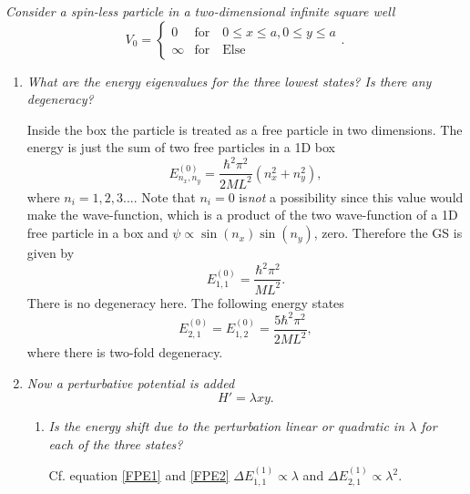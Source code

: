 \begin{example}
	\emph{Consider a spin-less particle in a two-dimensional infinite square well}
	\begin{equation}
		V_0=\begin{cases} 0 &\mbox{for} \quad 0\leq x\leq a, 0\leq y \leq a \\ 
			\infty & \mbox{for} \quad \mbox{Else}  \end{cases}. 
	\end{equation} 
	
	\begin{enumerate}
		\item \emph{What are the energy eigenvalues for the three lowest states? Is there any degeneracy?}\newline
		
		Inside the box the particle is treated as a free particle in two dimensions. The energy is just the sum of two free particles in a 1D box
		\begin{equation}
			E_{n_x,n_y}^{(0)}=\frac{\hbar^2\pi^2}{2ML^2}(n_x^2+n_y^2),
		\end{equation} 
		where $n_i=1,2,3...$. Note that $n_i=0$ is\emph{not} a possibility since this value would make the wave-function, which is a product of the two wave-function of a 1D free particle in a box and $\psi\propto \sin(n_x)\sin(n_y)$, zero. Therefore the GS is given by
		\begin{equation}
			E_{1,1}^{(0)}=\frac{\hbar^2\pi^2}{ML^2}.
		\end{equation} 
		There is no degeneracy here. The following energy states
		\begin{equation}
			E_{2,1}^{(0)}=E_{1,2}^{(0)}=\frac{5\hbar^2\pi^2}{2ML^2},
		\end{equation} 
		where there is two-fold degeneracy. \newline
		
		\item \emph{Now a perturbative potential is added}
		\begin{equation}
			H'=\lambda xy.
		\end{equation} 
		\begin{enumerate}
			\item \emph{Is the energy shift due to the perturbation linear or quadratic in $\lambda$ for each of the three states?}\newline
			
			Cf. equation \eqref{FPE1} and \eqref{FPE2} $\Delta E_{1,1}^{(1)}\propto\lambda$ and $\Delta E_{2,1}^{(1)}\propto\lambda^2$.
			

\end{enumerate}
\end{enumerate}
\end{example}
